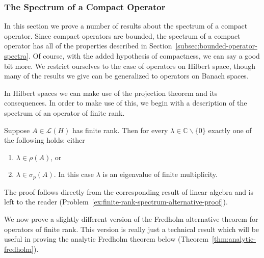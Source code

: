 \subsubsection{The Spectrum of a Compact Operator}\label{subsec:compact-operator-spectrum}

In this section we prove a number of results about the spectrum of a compact operator. Since compact operators are bounded, the spectrum of a compact operator has all of the properties described in Section~\ref{subsec:bounded-operator-spectra}. Of course, with the added hypothesis of compactness, we can say a good bit more. We restrict ourselves to the case of operators on Hilbert space, though many of the results we give can be generalized to operators on Banach spaces.

In Hilbert spaces we can make use of the projection theorem and its consequences. In order to make use of this, we begin with a description of the spectrum of an operator of finite rank.

\begin{Lemma}
\label{lem:finite-rank-spectrum-alternative}
Suppose $A\in\mathcal{L}(H)$ has finite rank. Then for every $\lambda\in\mathbb{C}\backslash\{0\}$ exactly one of the following holds: either\begin{enumerate}\item $\lambda\in\rho(A)$, or\item $\lambda\in\sigma_p(A)$. In this case $\lambda$ is an eigenvalue of finite multiplicity.\end{enumerate}
\end{Lemma}

The proof follows directly from the corresponding result of linear algebra and is left to the reader (Problem~\ref{ex:finite-rank-spectrum-alternative-proof}).

We now prove a slightly different version of the Fredholm alternative theorem for operators of finite rank. This version is really just a technical result which will be useful in proving the analytic Fredholm theorem below (Theorem~\ref{thm:analytic-fredholm}).

